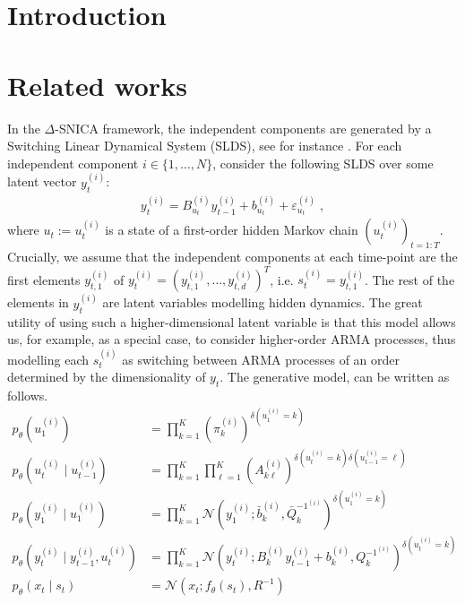 \documentclass{article}
\title{}
\date{}
\author[$\dag$]{XXX}
\newcommand{\eqsp}{\;}
\begin{document}
\maketitle

\begin{abstract}

\end{abstract}

\section{Introduction}
\section{Related works}

In the $\Delta$-SNICA framework, the independent components are generated by a Switching Linear Dynamical System (SLDS), see for instance \cite{}. For each independent component $i \in \{1,\dots,N\}$, consider the following SLDS over some latent vector $y_t^{(i)}$: 
\begin{align}
y_t^{(i)} = B_{u_t}^{(i)} y_{t-1}^{(i)} +  b_{u_t}^{(i)} + \varepsilon_{u_t}^{(i)} \eqsp, \label{eq:sld}
\end{align}
where $u_t:=u_t^{(i)}$ is a state of a first-order hidden Markov chain $(u_t^{(i)})_{t=1:T}$. Crucially, we assume that the independent components at each time-point are the first elements $y_{t,1}^{(i)}$ of $y_t^{(i)} = (y_{t,1}^{(i)}, \dots, y_{t,d}^{(i)})^T$, i.e. $s_t^{(i)} = y_{t,1}^{(i)}$. The rest of the elements in  $y_{t}^{(i)}$ are latent variables modelling hidden dynamics.
The great utility of using such a higher-dimensional latent variable is that this model allows us, for example, as a special case, to consider higher-order ARMA processes, thus modelling each $s_t^{(i)}$ as switching between ARMA processes of an order determined by the dimensionality of $y_t$. The generative model,  can be written as follows.
\begin{align}
    p_\theta(u_1^{(i)}) &= \prod_{k=1}^K (\pi_k^{(i)})^{\delta(u_1^{(i)} = k)} \\
    p_\theta(u_t^{(i)}\mid u_{t-1}^{(i)}) &= \prod_{k=1}^K\prod_{\ell=1}^K (A_{k\ell}^{(i)})^{ \delta(u_t^{(i)}=k)\delta(u_{t-1}^{(i)}=\ell)} \\
    p_\theta( y_1^{(i)}\mid u_1^{(i)}) &= \prod_{k=1}^K\mathcal{N}( y_1^{(i)} ; \bar{ b}_k^{(i)}, \bar{Q}_k^{-1^{(i)}})^{\delta(u_1^{(i)}=k)} \\
    p_\theta( y_t^{(i)}\mid  y_{t-1}^{(i)}, u_t^{(i)}) &= \prod_{k=1}^K \mathcal{N}( y_t^{(i)} ; B_k^{(i)}  y_{t-1}^{(i)} +  b_k^{(i)}, Q_k^{-1^{(i)}})^{\delta(u_t^{(i)}=k)} \\
    p_\theta( x_t\mid  s_t) &= \mathcal{N}( x_t ;  f_\theta(s_t),  R^{-1})
\end{align}
\end{document}
